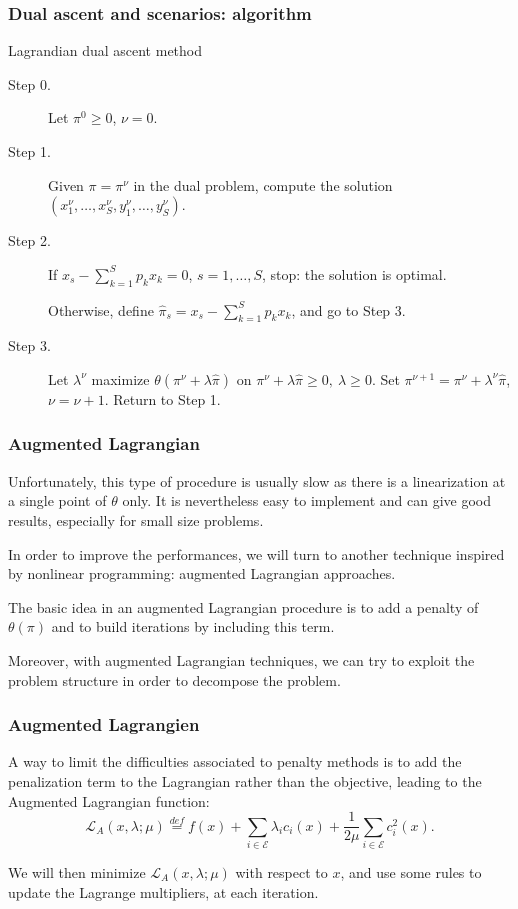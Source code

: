 \documentclass[french]{beamer}
\begin{document}
\begin{frame}
\frametitle{Dual ascent and scenarios: algorithm}

\begin{algo}{Lagrandian dual ascent method}
\begin{description}
\item[Step 0.] Let $\pi^0 \geq 0$, $\nu = 0$.
\item[Step 1.]
Given $\pi = \pi^{\nu}$ in the dual problem, compute the solution
$(x^{\nu}_1, \ldots, x^{\nu}_S, y_1^{\nu},\ldots{},y_S^{\nu})$.
\item[Step 2.]
If $x_s - \sum_{k = 1}^S p_kx_k = 0$, $s = 1,\ldots,S$, stop: the solution is optimal.

Otherwise, define $\hat{\pi}_s = x_s - \sum_{k=1}^S p_kx_k$, and go to Step 3.
\item[Step 3.]
Let $\lambda^\nu$ maximize $\theta(\pi^{\nu}+\lambda\hat{\pi})$ on
$\pi^{\nu}+\lambda\hat{\pi} \geq 0,\ \lambda \geq 0$.
Set $\pi^{\nu+1} = \pi^{\nu} + \lambda^{\nu}\hat{\pi}$, $\nu = \nu+1$. Return to Step 1.
\end{description}
\end{algo}

\end{frame}

\begin{frame}
\frametitle{Augmented Lagrangian}

Unfortunately, this type of procedure is usually slow as there is a linearization at a single point of $\theta$ only.
It is nevertheless easy to implement and can give good results, especially for small size problems.

\mbox{}

In order to improve the performances, we will turn to another technique inspired by nonlinear programming: {\blue augmented Lagrangian} approaches.

\mbox{}

The basic idea in an augmented Lagrangian procedure is to add a penalty of $\theta(\pi)$ and to build iterations by including this term.

\mbox{}

Moreover, with augmented Lagrangian techniques, we can try to exploit the problem structure in order to decompose the problem.

\end{frame}

\begin{frame}
\frametitle{Augmented Lagrangien}

A way to limit the difficulties associated to penalty methods is to add the penalization term to the Lagrangian rather than the objective, leading to the {\red Augmented Lagrangian} function:
\[
\mathcal{L}_A(x,\lambda;\mu) \overset{def}{=} f(x) + \sum_{i \in
\mathcal{E}} \lambda_i c_i(x) + \frac{1}{2\mu} \sum_{i \in
\mathcal{E}} c_i^2(x).
\]

\mbox{}

We will then minimize $\mathcal{L}_A(x,\lambda;\mu)$ with respect to $x$, and use some rules to update the Lagrange multipliers, at each iteration.

\end{frame}
\end{document}
